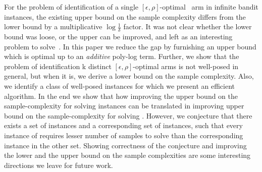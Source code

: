 For the problem of identification of a single $[\epsilon, \rho]$-optimal~\cite{bib:arcsk2017}
arm in infinite bandit instances, the existing upper bound on the sample complexity
differs from the lower bound by a multiplicative $\log\frac{1}{\delta}$ factor. 
It was not clear whether the lower bound was loose, or the upper can be improved,
and left as an interesting problem to solve~\cite{Aziz+AKA:2018}. 
In this paper we reduce the gap by furnishing an upper bound which is optimal up to an \textit{additive} poly-log term.
Further, we show that the problem of identification k distinct $[\epsilon, \rho]$-optimal 
arms is not well-posed in general, but when it is, we derive a lower bound on the sample complexity. 
Also, we identify a class of well-posed instances for which we present an efficient algorithm. 
In the end we show that how improving the upper bound on the sample-complexity for solving 
\QF instances can be translated in improving  upper bound on the 
sample-complexity for solving \QP. However, we conjecture that there exists a set of \QF instances 
and a corresponding set of \QP instances, such that every instance of \QF requires lesser number of samples to solve
than the corresponding \QP instance in the other set. Showing correctness of the conjecture and improving the
lower and the upper bound on the sample complexities are some interesting directions we leave for future work.

